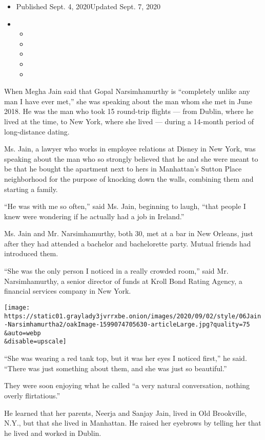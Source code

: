 \begin{itemize}
\item
  Published Sept. 4, 2020Updated Sept. 7, 2020
\item
  \begin{itemize}
  \item
  \item
  \item
  \item
  \item
  \end{itemize}
\end{itemize}

When Megha Jain said that Gopal Narsimhamurthy is ``completely unlike
any man I have ever met,'' she was speaking about the man whom she met
in June 2018. He was the man who took 15 round-trip flights --- from
Dublin, where he lived at the time, to New York, where she lived ---
during a 14-month period of long-distance dating.

Ms. Jain, a lawyer who works in employee relations at Disney in New
York, was speaking about the man who so strongly believed that he and
she were meant to be that he bought the apartment next to hers in
Manhattan's Sutton Place neighborhood for the purpose of knocking down
the walls, combining them and starting a family.

``He was with me so often,'' said Ms. Jain, beginning to laugh, ``that
people I knew were wondering if he actually had a job in Ireland.''

Ms. Jain and Mr. Narsimhamurthy, both 30, met at a bar in New Orleans,
just after they had attended a bachelor and bachelorette party. Mutual
friends had introduced them.

``She was the only person I noticed in a really crowded room,'' said Mr.
Narsimhamurthy, a senior director of funds at Kroll Bond Rating Agency,
a financial services company in New York.

\texttt{[image: https://static01.graylady3jvrrxbe.onion/images/2020/09/02/style/06Jain-Narsimhamurtha2/oakImage-1599074705630-articleLarge.jpg?quality=75\\\&auto=webp\\\&disable=upscale]}

``She was wearing a red tank top, but it was her eyes I noticed first,''
he said. ``There was just something about them, and she was just so
beautiful.''

They were soon enjoying what he called ``a very natural conversation,
nothing overly flirtatious.''

He learned that her parents, Neerja and Sanjay Jain, lived in Old
Brookville, N.Y., but that she lived in Manhattan. He raised her
eyebrows by telling her that he lived and worked in Dublin.

